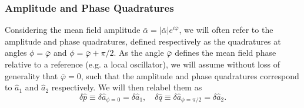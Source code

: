 \subsubsection{Amplitude and Phase Quadratures}
Considering the mean field amplitude \(\bar{\alpha} = |\bar{\alpha}| e^{i\bar{\varphi}}\), we will often refer to the amplitude and phase quadratures, defined respectively as the quadratures at angles \(\phi = \bar{\varphi}\) and \(\phi = \bar{\varphi} + \pi/2\). As the angle \(\bar{\varphi}\) defines the mean field phase relative to a reference (e.g. a local oscillator), we will assume without loss of generality that \(\bar{\varphi} = 0\), such that the amplitude and phase quadratures correspond to \(\hat{a}_1\) and \(\hat{a}_2\) respectively. We will then relabel them as
\begin{equation}
    \delta \hat{p}\equiv \delta \hat{a}_{\phi=0} = \delta \hat{a}_1, \quad
    \delta \hat{q} \equiv \delta \hat{a}_{\phi=\pi/2} = \delta \hat{a}_2.
\end{equation}



